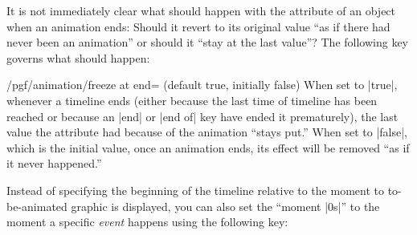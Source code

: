 It is not immediately clear what should happen with the attribute of
an object when an animation ends: Should it revert to its original
value ``as if there had never been an animation'' or should it ``stay
at the last value''? The following key governs what should happen:

\begin{key}{/pgf/animation/freeze at end= (default
  true, initially false)}
  When set to |true|, whenever a timeline ends (either because the
  last time of timeline has been reached or because an |end| or
  |end of| key have ended it prematurely), the last value the
  attribute had because of the animation ``stays put.'' When set to
  |false|, which is the initial value, once an animation ends, its
  effect will be removed ``as if it never happened.''
\begin{codeexample}[animation list={0,1,2,3,4}]
\end{codeexample}
\begin{codeexample}[animation list={0,1,2,3,4}]
\end{codeexample}
\end{key}

Instead of specifying the beginning of the timeline relative to the
moment to to-be-animated graphic is displayed, you can also set the
``moment |0s|'' to the moment a specific \emph{event} happens using
the following key:

